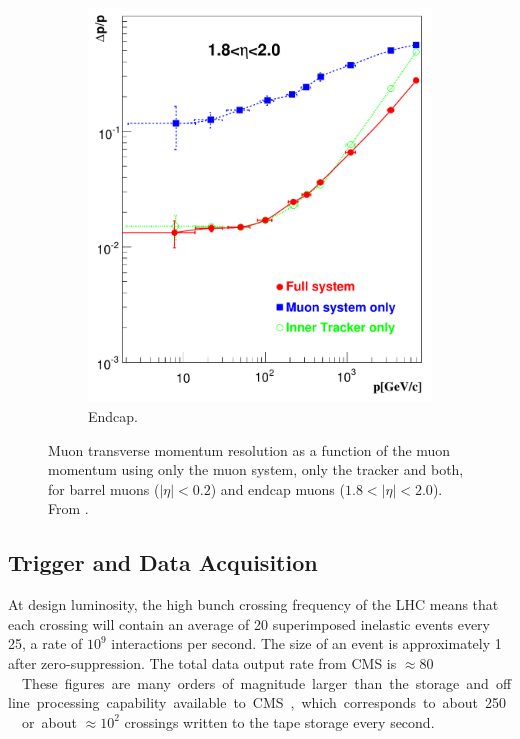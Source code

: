 \begin{figure}[htbp]
\begin{subfigure}{0.48\textwidth}
    \includegraphics[width=\textwidth]{muon_endcap}
    \caption{Endcap.}
    \label{fig:muon_endcap}
  \end{subfigure}
  \caption[Muon transverse momentum resolution as a function of the muon
momentum.] {Muon transverse momentum resolution as a function of the muon
momentum using only the muon system, only the tracker and both, for barrel muons
($|\eta| < 0.2$) and endcap muons ($1.8<|\eta| < 2.0$). From
\cite{chatrchyan2008cms}.\label{fig:muon_performance}}
\end{figure}

\subsection{Trigger and Data Acquisition}
At design luminosity, the high bunch crossing frequency of the LHC means that
each crossing will contain an average of 20 superimposed inelastic
events every \unit{25}{\nano\second}, a rate of $10^{9}$ interactions per
second.
The size of an event is approximately \unit{1}{\mega\bel} after zero-suppression.
The total data output rate from CMS is \unit{$\approx 80$}{\tera\bel\per\second}.
These figures are many orders of magnitude larger than the storage and offline
processing capability available to CMS, which corresponds to about
\unit{250}{\mega\bel\per\second} or about $\approx 10^{2}$ crossings written to the tape
storage every second. 


